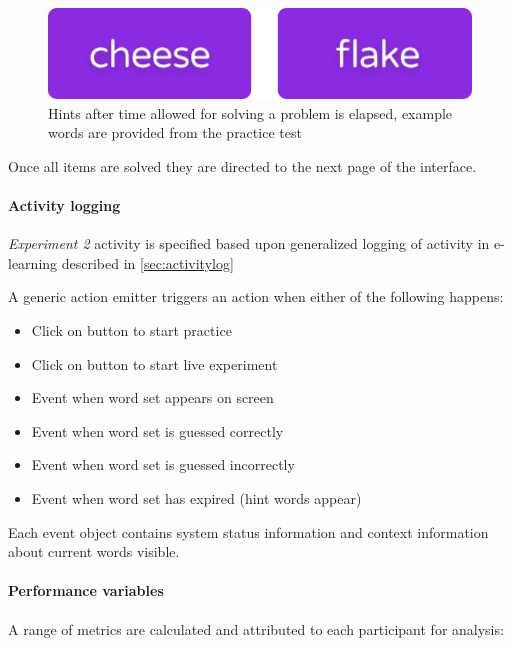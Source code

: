		\begin{figure}
			\centering
			\includegraphics[width=0.3\linewidth]{graphics/Hint-buttons}
			\caption{Hints after time allowed for solving a problem is elapsed, example words are provided from the practice test}
			\label{fig:hint-buttons}
		\end{figure}
		
		Once all items are solved they are directed to the next page of the interface.
				
		\paragraph{Activity logging} \textit{Experiment 2} activity is specified based upon generalized logging of activity in e-learning described in \ref{sec:activitylog}
		
		A generic action emitter triggers an action when either of the following happens:
		
		\begin{itemize}
			\item Click on button to start practice
			\item Click on button to start live experiment
			\item Event when word set appears on screen
			\item Event when word set is guessed correctly
			\item Event when word set is guessed incorrectly
			\item Event when word set has expired (hint words appear)
		\end{itemize}
	
		Each event object contains system status information and context information about current words visible.

		\paragraph{Performance variables} \label{sec:creativity-parameters}
		
		A range of metrics are calculated and attributed to each participant for analysis:
		
